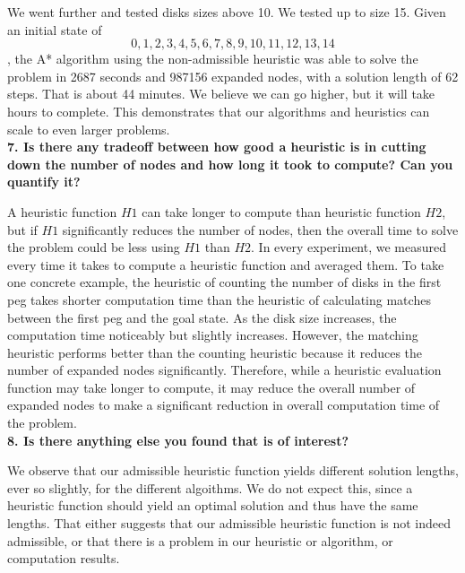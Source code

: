 We went further and tested disks sizes above 10. We tested up to size 15. Given an initial state of \[0,1,2,3,4,5,6,7,8,9,10,11,12,13,14\], the A* algorithm using the non-admissible heuristic was able to solve the problem in 2687 seconds and 987156 expanded nodes, with a solution length of 62 steps. That is about 44 minutes. We believe we can go higher, but it will take hours to complete. This demonstrates that our algorithms and heuristics can scale to even larger problems.\\

\textbf{7. Is there any tradeoff between how good a heuristic is in cutting down the number of nodes and how long it took to compute? Can you quantify it?}

A heuristic function $H1$ can take longer to compute than heuristic function $H2$, but if $H1$ significantly reduces the number of nodes, then the overall time to solve the problem could be less using $H1$ than $H2$. In every experiment, we measured every time it takes to compute a heuristic function and averaged them. To take one concrete example, the heuristic of counting the number of disks in the first peg takes shorter computation time than the heuristic of calculating matches between the first peg and the goal state. As the disk size increases, the computation time noticeably but slightly increases. However, the matching heuristic performs better than the counting heuristic because it reduces the number of expanded nodes significantly. Therefore, while a heuristic evaluation function may take longer to compute, it may reduce the overall number of expanded nodes to make a significant reduction in overall computation time of the problem.\\

\textbf{8. Is there anything else you found that is of interest?}

We observe that our admissible heuristic function yields different solution lengths, ever so slightly, for the different algoithms. We do not expect this, since a heuristic function should yield an optimal solution and thus have the same lengths. That either suggests that our admissible heuristic function is not indeed admissible, or that there is a problem in our heuristic or algorithm, or computation results.
